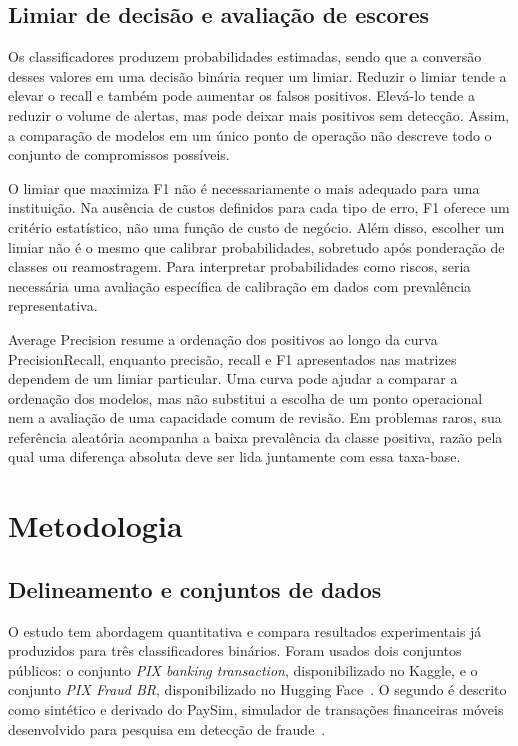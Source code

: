 \documentclass[11pt,a4paper]{article}
\begin{document}
\subsection{Limiar de decisão e avaliação de escores}

Os classificadores produzem probabilidades estimadas, sendo que a conversão desses valores em uma decisão binária requer um limiar. Reduzir o limiar tende a elevar o recall e também pode aumentar os falsos positivos. Elevá-lo tende a reduzir o volume de alertas, mas pode deixar mais positivos sem detecção. Assim, a comparação de modelos em um único ponto de operação não descreve todo o conjunto de compromissos possíveis.

O limiar que maximiza F1 não é necessariamente o mais adequado para uma instituição. Na ausência de custos definidos para cada tipo de erro, F1 oferece um critério estatístico, não uma função de custo de negócio. Além disso, escolher um limiar não é o mesmo que calibrar probabilidades, sobretudo após ponderação de classes ou reamostragem. Para interpretar probabilidades como riscos, seria necessária uma avaliação específica de calibração em dados com prevalência representativa.

Average Precision resume a ordenação dos positivos ao longo da curva Precision\textendash{}Recall, enquanto precisão, recall e F1 apresentados nas matrizes dependem de um limiar particular. Uma curva pode ajudar a comparar a ordenação dos modelos, mas não substitui a escolha de um ponto operacional nem a avaliação de uma capacidade comum de revisão. Em problemas raros, sua referência aleatória acompanha a baixa prevalência da classe positiva, razão pela qual uma diferença absoluta deve ser lida juntamente com essa taxa-base.

\section{Metodologia}

\subsection{Delineamento e conjuntos de dados}

O estudo tem abordagem quantitativa e compara resultados experimentais já produzidos para três classificadores binários. Foram usados dois conjuntos públicos: o conjunto \textit{PIX banking transaction}, disponibilizado no Kaggle, e o conjunto \textit{PIX Fraud BR}, disponibilizado no Hugging Face~\cite{juniorbuenoPixTransaction,messina2025pixfraudbr}. O segundo é descrito como sintético e derivado do PaySim, simulador de transações financeiras móveis desenvolvido para pesquisa em detecção de fraude~\cite{LopezRojas2016PaySim}.
\end{document}
